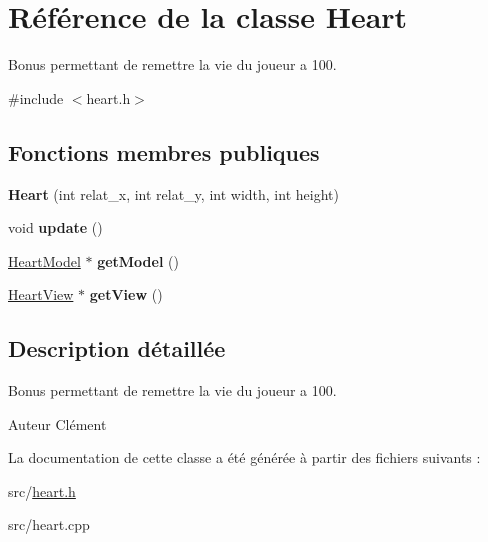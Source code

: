 \hypertarget{class_heart}{\section{Référence de la classe Heart}
\label{class_heart}
}


Bonus permettant de remettre la vie du joueur a 100.  




{\ttfamily \#include $<$heart.\+h$>$}

\subsection*{Fonctions membres publiques}
\begin{DoxyCompactItemize}
\item 
\hypertarget{class_heart_a347d0c93d987e1e6a1eed154f28721df}{{\bfseries Heart} (int relat\+\_\+x, int relat\+\_\+y, int width, int height)}\label{class_heart_a347d0c93d987e1e6a1eed154f28721df}

\item 
\hypertarget{class_heart_af42ab0276d1f246cc64318278f1a6aea}{void {\bfseries update} ()}\label{class_heart_af42ab0276d1f246cc64318278f1a6aea}

\item 
\hypertarget{class_heart_a25958551e41bf81031403f6a211f82be}{\hyperlink{class_heart_model}{Heart\+Model} $\ast$ {\bfseries get\+Model} ()}\label{class_heart_a25958551e41bf81031403f6a211f82be}

\item 
\hypertarget{class_heart_ae19364f9f6b8a904a707cea1eed538a6}{\hyperlink{class_heart_view}{Heart\+View} $\ast$ {\bfseries get\+View} ()}\label{class_heart_ae19364f9f6b8a904a707cea1eed538a6}

\end{DoxyCompactItemize}


\subsection{Description détaillée}
Bonus permettant de remettre la vie du joueur a 100. 

\begin{DoxyAuthor}{Auteur}
Clément 
\end{DoxyAuthor}


La documentation de cette classe a été générée à partir des fichiers suivants \+:\begin{DoxyCompactItemize}
\item 
src/\hyperlink{heart_8h}{heart.\+h}\item 
src/heart.\+cpp\end{DoxyCompactItemize}
